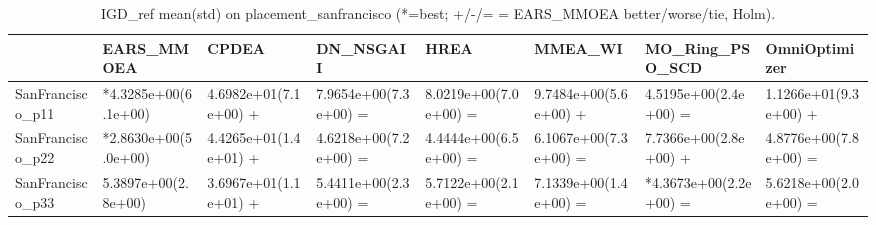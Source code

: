 \begin{table}[t]
\centering
\caption{IGD_ref mean(std) on placement_sanfrancisco (*=best; +/-/= = EARS_MMOEA better/worse/tie, Holm).}
\label{tab:placement_sanfrancisco_IGD_ref}
\begin{tabular}{llllllll}
\toprule
 & EARS\_MMOEA & CPDEA & DN\_NSGAII & HREA & MMEA\_WI & MO\_Ring\_PSO\_SCD & OmniOptimizer \\
\midrule
SanFrancisco\_p11 & *4.3285e+00(6.1e+00) & 4.6982e+01(7.1e+00) + & 7.9654e+00(7.3e+00) = & 8.0219e+00(7.0e+00) = & 9.7484e+00(5.6e+00) + & 4.5195e+00(2.4e+00) = & 1.1266e+01(9.3e+00) + \\
SanFrancisco\_p22 & *2.8630e+00(5.0e+00) & 4.4265e+01(1.4e+01) + & 4.6218e+00(7.2e+00) = & 4.4444e+00(6.5e+00) = & 6.1067e+00(7.3e+00) = & 7.7366e+00(2.8e+00) + & 4.8776e+00(7.8e+00) = \\
SanFrancisco\_p33 & 5.3897e+00(2.8e+00) & 3.6967e+01(1.1e+01) + & 5.4411e+00(2.3e+00) = & 5.7122e+00(2.1e+00) = & 7.1339e+00(1.4e+00) = & *4.3673e+00(2.2e+00) = & 5.6218e+00(2.0e+00) = \\
\bottomrule
\end{tabular}
\end{table}

